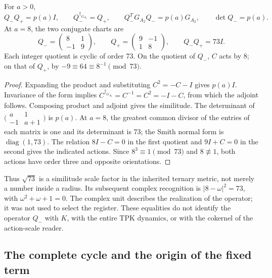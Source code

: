 \begin{proposition}
\label{lib02:norma-A2}
For \(a>0\),
\[
 Q_-Q_+=p(a)I,\qquad Q_-^{\dagger_{G_{A_2}}}=Q_+,
 \qquad Q_-^TG_{A_2}Q_-=p(a)G_{A_2},\qquad \det Q_-=p(a).
\]
At \(a=8\), the two conjugate charts are
\[
 Q_-=
 \begin{pmatrix}8&1\\-1&9\end{pmatrix},\qquad
 Q_+=\begin{pmatrix}9&-1\\1&8\end{pmatrix},\qquad Q_-Q_+=73I.
\]
Each integer quotient is cyclic of order 73. On the quotient of \(Q_-\), \(C\) acts by \(8\); on that of \(Q_+\), by \(-9\equiv64\equiv8^{-1}\pmod{73}\).
\end{proposition}
\begin{proof}
Expanding the product and substituting \(C^2=-C-I\) gives \(p(a)I\). Invariance of the form implies \(C^{\dagger_{G_{A_2}}}=C^{-1}=C^2=-I-C\), from which the adjoint follows. Composing product and adjoint gives the similitude. The determinant of \(\bigl(\begin{smallmatrix}a&1\\-1&a+1\end{smallmatrix}\bigr)\) is \(p(a)\). At \(a=8\), the greatest common divisor of the entries of each matrix is one and its determinant is 73; the Smith normal form is \(\operatorname{diag}(1,73)\). The relation \(8I-C=0\) in the first quotient and \(9I+C=0\) in the second gives the indicated actions. Since \(8^3\equiv1\pmod{73}\) and \(8\not\equiv1\), both actions have order three and opposite orientations.
\end{proof}

Thus \(\sqrt{73}\) is a similitude scale factor in the inherited ternary metric, not merely a number inside a radius. Its subsequent complex recognition is \(|8-\omega|^2=73\), with \(\omega^2+\omega+1=0\). The complex unit describes the realization of the operator; it was not used to select the register. These equalities do not identify the operator \(Q_-\) with \(K\), with the entire TPK dynamics, or with the cokernel of the action-scale reader.

\subsection{The complete cycle and the origin of the fixed term}
\label{lib02:ciclo-completo}

